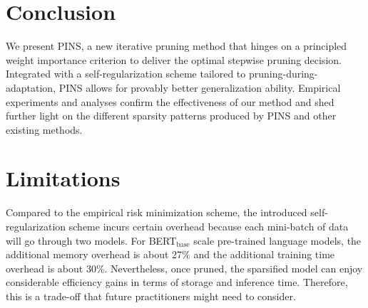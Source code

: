 \section{Conclusion}
We present PINS, a new iterative pruning method that hinges on a principled weight importance criterion to deliver the optimal stepwise pruning decision. Integrated with a self-regularization scheme tailored to pruning-during-adaptation, PINS allows for provably better generalization ability. Empirical experiments and analyses confirm the effectiveness of our method and shed further light on the different sparsity patterns produced by PINS and other existing methods.

\section*{Limitations}
Compared to the empirical risk minimization scheme, the introduced self-regularization scheme incurs certain overhead because each mini-batch of data will go through two models. For BERT$_{\text{base}}$ scale pre-trained language models, the additional memory overhead is about 27\% and the additional training time overhead is about 30\%. Nevertheless, once pruned, the sparsified model can enjoy considerable efficiency gains in terms of storage and inference time. Therefore, this is a trade-off that future practitioners might need to consider.